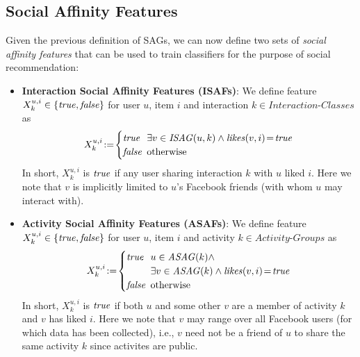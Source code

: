 \subsection{Social Affinity Features}

\label{ssec:SAfeature}

Given the previous definition of SAGs, we can now define two
sets of \emph{social affinity features} that can be used to train
classifiers for the purpose of social recommendation:

\begin{itemize} 
\item \textbf{Interaction Social Affinity Features (ISAFs)}: 
We define feature $X^{u,i}_k \in \{ \true, \false \}$ for user $u$, item $i$ and interaction
$k \in \textit{Interaction-Classes}$ as
  \begin{equation*}
   X^{u,i}_{k} \! := \!
      \begin{cases}
   		\true  \!\!\! & \exists v \in \mathit{ISAG}(u,k) \wedge \likes(v,i)\!=\!\true\\ 
   		\false \!\!\! & \text{otherwise}
      \end{cases}
  \end{equation*}
   In short, $X^{u,i}_{k}$ is $\true$ if any user sharing interaction $k$ with $u$ liked $i$.
   Here we note that $v$ is implicitly limited to $u$'s Facebook friends (with whom $u$
   may interact with).
\item \textbf{Activity Social Affinity Features (ASAFs)}: 
We define feature $X^{u,i}_k \in \{ \true, \false \}$ for user $u$, item $i$ and activity
$k \in \textit{Activity-Groups}$ as
  \begin{equation*}
   X^{u,i}_{k} \! := \! 
      \begin{cases}
   		\true  \!\!\! & u \in \mathit{ASAG}(k) \wedge \\
                              & \exists v \in \mathit{ASAG}(k) \wedge \likes(v,i)\!=\!\true\\
   		\false \!\!\! & \text{otherwise}
      \end{cases}
  \end{equation*}
  In short, $X^{u,i}_{k}$ is $\true$ if both $u$ and some other $v$ are a member of activity $k$
  and $v$ has liked $i$.  Here we note that $v$ may range over all Facebook users (for which
  data has been collected), i.e., $v$ need not be a friend of $u$ to share the same activity $k$
  since activites are public.
\end{itemize}




